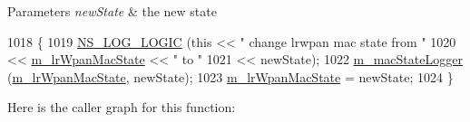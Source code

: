 \begin{DoxyParams}{Parameters}
{\em new\+State} & the new state \\
\hline
\end{DoxyParams}

\begin{DoxyCode}
1018 \{
1019   \hyperlink{group__logging_ga88acd260151caf2db9c0fc84997f45ce}{NS\_LOG\_LOGIC} (\textcolor{keyword}{this} << \textcolor{stringliteral}{" change lrwpan mac state from "}
1020                      << \hyperlink{classns3_1_1LrWpanMac_ab5cdfd39de7397d658d300961dab3ed0}{m\_lrWpanMacState} << \textcolor{stringliteral}{" to "}
1021                      << newState);
1022   \hyperlink{classns3_1_1LrWpanMac_a7545ecfb4bdf7436739d00507872d248}{m\_macStateLogger} (\hyperlink{classns3_1_1LrWpanMac_ab5cdfd39de7397d658d300961dab3ed0}{m\_lrWpanMacState}, newState);
1023   \hyperlink{classns3_1_1LrWpanMac_ab5cdfd39de7397d658d300961dab3ed0}{m\_lrWpanMacState} = newState;
1024 \}
\end{DoxyCode}


Here is the caller graph for this function\+:


